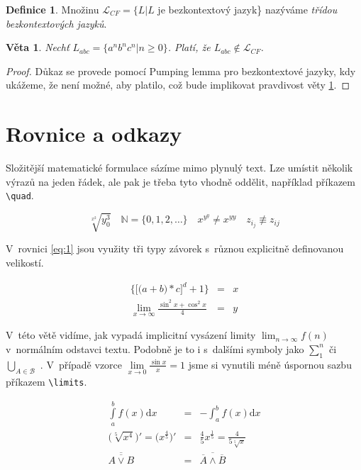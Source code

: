 \documentclass[11pt,twocolumn,a4paper]{article}
\theoremstyle{definition}
\newtheorem{mydef}{Definice}[section]
\theoremstyle{plain}
\newtheorem{mylem}{Věta}
\begin{document}
\theoremstyle{definition}
\begin{mydef}
Množinu $\mathcal{L}_{CF} = \{L|L$ je bezkontextový jazyk\} nazýváme \textit{třídou bezkontextových jazyků}.
\end{mydef}

\theoremstyle{plain}
\begin{mylem}\label{lem:1}
Nechť $L_{abc}=\{a^nb^nc^n|n\geq0\}$. Platí, že $L_{abc}\notin \mathcal{L}_{CF}$.
\end{mylem}

\begin{proof}
Důkaz se provede pomocí Pumping lemma pro bezkontextové jazyky, kdy ukážeme, že není možné, aby platilo, což bude implikovat pravdivost věty \ref{lem:1}.
\end{proof}

\section{Rovnice a odkazy}

Složitější matematické formulace sázíme mimo plynulý text. Lze umístit několik výrazů na jeden řádek, ale pak je třeba tyto vhodně oddělit, například příkazem \verb|\quad|. 

\begin{equation*}
\sqrt[x^2]{y^{3}_{0}}\quad \mathbb{N}=\{0,1,2, \dots \}\quad x^{y^y}\neq x^{yy}\quad z_{i_j}\not\equiv  z_{ij} 
\end{equation*}

V~rovnici \eqref{eq:1} jsou využity tři typy závorek s~různou explicitně definovanou velikostí.

\begin{eqnarray}
\bigg\{ \Big[ \big(a+b\big)*c\Big]^d+1\bigg\} & = & x \label{eq:1}\\
\lim\limits_{x\to\infty} \frac{\sin^2x + \cos^2x}{4} & = & y \nonumber
\end{eqnarray}

V~této větě vidíme, jak vypadá implicitní vysázení limity $\lim_{n\to\infty} f(n)$ v~normálním odstavci textu. Podobně je to i s~dalšími symboly jako $\sum_{1}^{n}$ či $\bigcup_{A\in \mathcal{B}}$ . V~případě vzorce $\lim\limits_{x\to 0} \frac{\sin x}{x} = 1$ jsme si vynutili méně úspornou sazbu příkazem \verb|\limits|.

\begin{eqnarray}
\int\limits_{a}^{b} f(x) \mathrm{d}x & = & -\int_{a}^{b} f(x) \mathrm{d}x\\ 
\Big(\sqrt[5]{x^4}\Big)' = \Big(x^\frac{4}{5}\Big)' & = & \frac{4}{5}x^{\frac{1}{5}} = \frac{4}{5\sqrt[5]{x}}\\ 
\overline{\overline{A\vee B}} & = & \overline{\overline{A} \wedge \overline{B}} 
\end{eqnarray}
\end{document}
